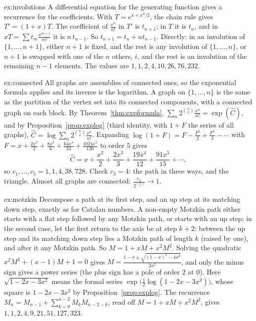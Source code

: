 \begin{solution}{ex:involutions}
\idea A differential equation for the generating function gives a recurrence for the coefficients.
\writeup With $T=e^{x+x^2/2}$, the chain rule gives $T'=(1+x)T$. The coefficient of $\frac{x^n}{n!}$ in $T'$ is $t_{n+1}$; in $T$ it
is $t_n$, and in $xT=\sum t_m\frac{x^{m+1}}{m!}$ it is $n\,t_{n-1}$. So $t_{n+1}=t_n+nt_{n-1}$. Directly: in an involution of
$\{1,\dots,n+1\}$, either $n+1$ is fixed, and the rest is any involution of $\{1,\dots,n\}$, or $n+1$ is swapped with one of
the $n$ others, $i$, and the rest is an involution of the remaining $n-1$ elements. The values are $1,1,2,4,10,26,76,232$.
\end{solution}

\begin{solution}{ex:connected}
\idea All graphs are assemblies of connected ones, so the exponential formula applies and its inverse is the logarithm.
\writeup A graph on $\{1,\dots,n\}$ is the same as the partition of the vertex set into its connected components, with a
connected graph on each block. By Theorem~\ref{thm:expformula}, $\sum_n2^{\binom n2}\frac{x^n}{n!}=\exp(\hat C)$, and by
Proposition~\ref{prop:explog} (third identity, with $1+F$ the series of all graphs), $\hat C=\log\sum_n2^{\binom n2}\frac{x^n}{n!}$.
Expanding $\log(1+F)=F-\frac{F^2}2+\frac{F^3}3-\cdots$ with $F=x+\frac{2x^2}2+\frac{8x^3}6+\frac{64x^4}{24}+\frac{1024x^5}{120}$ to order $5$ gives
\[
\hat C=x+\frac{x^2}2+\frac{2x^3}3+\frac{19x^4}{12}+\frac{91x^5}{15}+\cdots,
\]
so $c_1,\dots,c_5=1,1,4,38,728$. Check $c_3=4$: the path in three ways, and the triangle. Almost all graphs are connected:
$\frac{c_n}{2^{\binom n2}}\to1$.
\end{solution}

\begin{solution}{ex:motzkin}
\idea Decompose a path at its first step, and an up step at its matching down step, exactly as for Catalan numbers.
\writeup A non-empty Motzkin path either starts with a flat step followed by any Motzkin path, or starts with an up step;
in the second case, let the first return to the axis be at step $k+2$: between the up step and its matching down step
lies a Motzkin path of length $k$ (raised by one), and after it any Motzkin path. So $M=1+xM+x^2M^2$. Solving the quadratic
$x^2M^2+(x-1)M+1=0$ gives $M=\frac{1-x\pm\sqrt{(1-x)^2-4x^2}}{2x^2}$, and only the minus sign gives a power series (the plus
sign has a pole of order $2$ at $0$). Here $\sqrt{1-2x-3x^2}$ means the formal series $\exp\bigl(\frac12\log(1-2x-3x^2)\bigr)$,
whose square is $1-2x-3x^2$ by Proposition~\ref{prop:explog}. The recurrence $M_n=M_{n-1}+\sum_{k=0}^{n-2}M_kM_{n-2-k}$, read off
$M=1+xM+x^2M^2$, gives $1,1,2,4,9,21,51,127,323$.
\end{solution}

